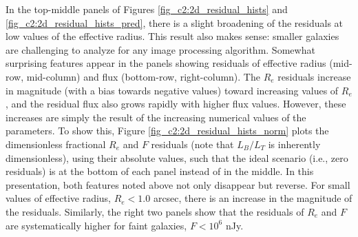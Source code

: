 In the top-middle panels of Figures \ref{fig_c2:2d_residual_hists} and \ref{fig_c2:2d_residual_hists_pred}, there is a slight broadening of the residuals at low values of the effective radius. This result also makes sense: smaller galaxies are challenging to analyze for any image processing algorithm. Somewhat surprising features appear in the panels showing residuals of effective radius (mid-row, mid-column) and flux (bottom-row, right-column). The $R_e$ residuals increase in magnitude (with a bias towards negative values) toward increasing values of $R_e$, and the residual flux also grows rapidly with higher flux values. However, these increases are simply the result of the increasing numerical values of the parameters. To show this, Figure \ref{fig_c2:2d_residual_hists_norm} plots the dimensionless fractional $R_e$ and $F$ residuals (note that $L_B/L_T$ is inherently dimensionless), using their absolute values, such that the ideal scenario (i.e., zero residuals) is at the bottom of each panel instead of in the middle. 
In this presentation, both features noted above not only disappear but reverse.
For small values of effective radius, $R_e < 1.0$ arcsec, there is an increase in the magnitude of the residuals.
Similarly, the right two panels show that the residuals of $R_e$ and $F$ are systematically higher for faint galaxies, $F< 10^6$ nJy.%

